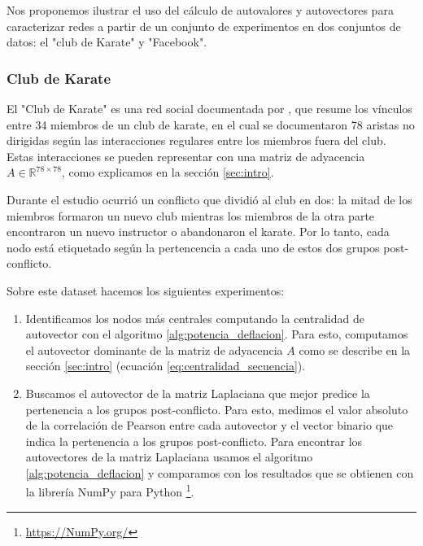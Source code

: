 \documentclass{article}
\begin{document}
Nos proponemos ilustrar el uso del cálculo de autovalores y autovectores para caracterizar redes a partir de un conjunto de experimentos en dos conjuntos de datos: el "club de Karate"  y "Facebook".

\subsubsection{Club de Karate} \label{sec:karate}

El "Club de Karate" es una red social documentada por \citet{zachary1977information}, que resume los vínculos entre 34 miembros de un club de karate, en el cual se documentaron 78 aristas no dirigidas según las interacciones regulares entre los miembros fuera del club. Estas interacciones se pueden representar con una matriz de adyacencia $A \in \mathbb{R}^{78 \times 78}$, como explicamos en la sección \ref{sec:intro}. 

Durante el estudio ocurrió un conflicto que dividió al club en dos: la mitad de los miembros formaron un nuevo club mientras los miembros de la otra parte encontraron un nuevo instructor o abandonaron el karate. Por lo tanto, cada nodo está etiquetado según la pertencencia a cada uno de estos dos grupos post-conflicto.


Sobre este dataset hacemos los siguientes experimentos:

\begin{enumerate}[leftmargin=.5cm]
    
    \item Identificamos los nodos más centrales computando la centralidad de autovector con el algoritmo \ref{alg:potencia_deflacion}. Para esto, computamos el autovector dominante de la matriz de adyacencia $A$ como se describe en la sección \ref{sec:intro} (ecuación \ref{eq:centralidad_secuencia}).
    
    \item Buscamos el autovector de la matriz Laplaciana que mejor predice la pertenencia a los grupos post-conflicto. Para esto, medimos el valor absoluto de la correlación de Pearson entre cada autovector y el vector binario que indica la pertenencia a los grupos post-conflicto. Para encontrar los autovectores de la matriz Laplaciana usamos el algoritmo \ref{alg:potencia_deflacion} y comparamos con los resultados que se obtienen con la librería NumPy para Python \footnote{\url{https://NumPy.org/}}. 
    
\end{enumerate}
\end{document}
